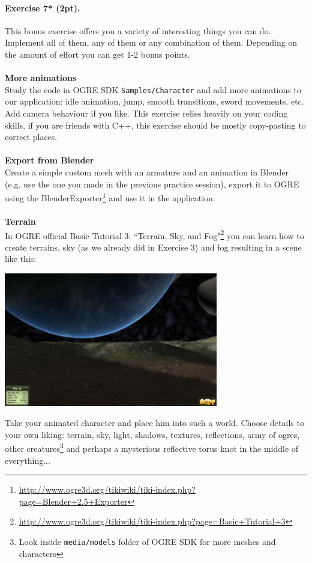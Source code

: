 \documentclass{article}
\newenvironment{exercise}[2]{\paragraph{Exercise #1 (#2pt).} }{
\medskip}
\begin{document}
\begin{exercise}{7*}{2}
This bonus exercise offers you a variety of interesting things you can do. Implement all of them, any of them or any combination of them. Depending on the amount of effort you can get 1-2 bonus points.
\\
\\
\textbf{More animations}\\
Study the code in OGRE SDK \verb#Samples/Character# and add more animations to our application: idle animation, jump, smooth transitions, sword movements, etc. Add camera behaviour if you like. This exercise relies heavily on your coding skills, if you are friends with C++, this exercise should be mostly copy-pasting to correct places.
\\
\\
\textbf{Export from Blender}\\
Create a simple custom mesh with an armature and an animation in Blender (e.g. use the one you made in the previous practice session), export it to OGRE using the BlenderExporter\footnote{\url{http://www.ogre3d.org/tikiwiki/tiki-index.php?page=Blender+2.5+Exporter}} and use it in the application.
\ \\
\ \\
\textbf{Terrain}\\
In OGRE official Basic Tutorial 3: ``Terrain, Sky, and Fog"\footnote{\url{http://www.ogre3d.org/tikiwiki/tiki-index.php?page=Basic+Tutorial+3}} you can learn how to create terrains, sky (as we already did in Exercise 3) and fog resulting in a scene like this:
\begin{center}
\includegraphics[width=0.7\textwidth]{terrain.jpg}
\end{center}
Take your animated character and place him into such a world. Choose details to your own liking: terrain, sky, light, shadows, textures, reflections, army of ogres, other creatures\footnote{Look inside \texttt{media/models} folder of OGRE SDK for more meshes and characters} and perhaps a mysterious reflective torus knot in the middle of everything...
\end{exercise}
\end{document}
